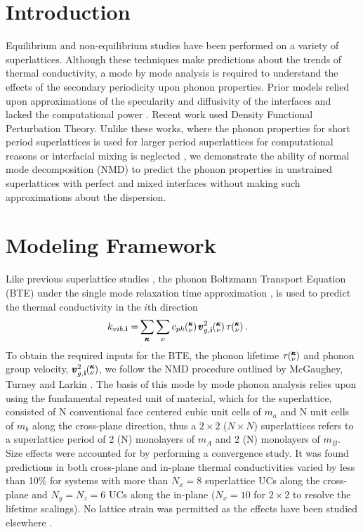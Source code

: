 \documentclass[aps,prb,preprint,preprintnumbers,amsmath,amssymb,floatfix,superscriptaddress]{revtex4}
\newcommand{\kv}{\mspace{-4.0mu}\left(\mspace{-8.0mu}
\begin{smallmatrix}&\pmb{\kappa} \\&\nu\end{smallmatrix}
\mspace{-3.0mu}\right)}
\begin{document}
\section{Introduction}
Equilibrium \cite {PhysRevB.85.195302} and non-equilibrium \cite {PhysRevB.79.214307,PhysRevB.79.075316,PhysRevB.72.174302} studies have been performed on a variety of superlattices. Although these techniques make predictions about the trends of thermal conductivity, a mode by mode analysis is required to understand the effects of the secondary periodicity upon phonon properties. Prior models relied upon approximations of the specularity and diffusivity of the interfaces \cite {PhysRevB.57.14958} and lacked the computational power \cite {PhysRevB.70.081310}. Recent work \cite{Luckyanova16112012,doi:10.1021/nl202186y} used Density Functional Perturbation Theory. Unlike these works, where the phonon properties for short period superlattices is used for larger period superlattices for computational reasons \cite{Luckyanova16112012, doi:10.1021/nl202186y} or interfacial mixing is neglected \cite{doi:10.1021/nl202186y}, we demonstrate the ability of normal mode decomposition (NMD) to predict the phonon properties in unstrained superlattices with perfect and mixed interfaces without making such approximations about the dispersion.
\section{Modeling Framework}
Like previous superlattice studies \cite{Luckyanova16112012,doi:10.1021/nl202186y}, the phonon Boltzmann Transport Equation (BTE) under the single mode relaxation time approximation \cite{ziman_electrons_2001}, is used to predict the thermal conductivity in the $i$th direction
\begin{equation}\label{EQ:M:conductivity}
\begin{split}
k_{vib,\mathbf{i}}=&\sum_{\pmb{\kappa}} \sum_\nu c_{ph}\kv
\pmb{v}^{2}_{g,\mathbf{i}}\kv \tau\kv.
\end{split}
\end{equation}
To obtain the required inputs for the BTE, the phonon lifetime $\tau\kv$ and phonon group velocity, $\pmb{v}^{2}_{g,\mathbf{i}}\kv$, we follow the NMD procedure outlined by McGaughey\cite{PhysRevB.71.184305}, Turney \cite {PhysRevB.81.081411} and Larkin \cite{jason_inpress}. The basis of this mode by mode phonon analysis relies upon using the fundamental repeated unit of material, which for the superlattice, consisted of N conventional face centered cubic unit cells of $m_a$ and N unit cells of $m_b$ along the cross-plane direction, thus a $2\times2$ ($N\times N$) superlattices refers to a superlattice period of 2 (N) monolayers of $m_A$ and 2 (N) monolayers of $m_B$. Size effects were accounted for by performing a convergence study. It was found predictions in both cross-plane and in-plane thermal conductivities varied by less than 10\% for systems with more than $N_x=8$ superlattice UCs along the cross-plane and $N_y=N_z=6$ UCs along the in-plane ($N_x=10$ for $2\times2$ to resolve the lifetime scalings). No lattice strain was permitted as the effects have been studied elsewhere \cite{PhysRevB.72.174302}. 
\end{document}
